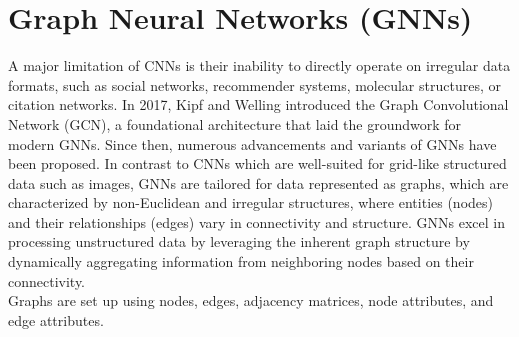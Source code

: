 \section{Graph Neural Networks (GNNs)} \label{gnnse}
A major limitation of CNNs is their inability to directly operate on irregular data formats, such as social networks, recommender systems, molecular structures, or citation networks. In 2017, Kipf and Welling \cite{kipf} introduced the Graph Convolutional Network (GCN), a foundational architecture that laid the groundwork for modern GNNs. Since then, numerous advancements and variants of GNNs have been proposed. In contrast to CNNs which are well-suited for grid-like structured data such as images, GNNs are tailored for data represented as graphs, which are characterized by non-Euclidean and irregular structures, where entities (nodes) and their relationships (edges) vary in connectivity and structure. \gls{GNN}s excel in processing unstructured data by leveraging the inherent graph structure by dynamically aggregating information from neighboring nodes based on their connectivity. \\
Graphs are set up using nodes, edges, adjacency matrices, node attributes, and edge attributes. 
